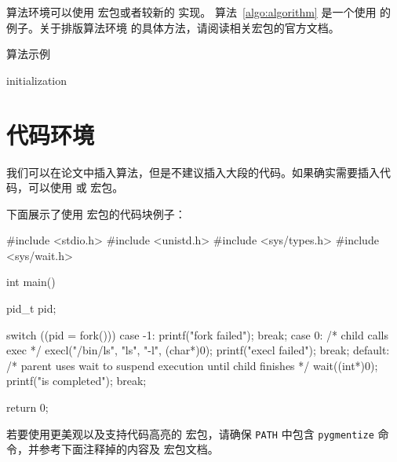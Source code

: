 算法环境可以使用  宏包或者较新的  实现。
算法~\ref{algo:algorithm} 是一个使用  的例子。关于排版算法环境
的具体方法，请阅读相关宏包的官方文档。

\begin{algorithm}[htb]
  \caption{算法示例}
  \label{algo:algorithm}
  \small
  \SetAlgoLined

  initialization\;
\end{algorithm}

\section{代码环境}

我们可以在论文中插入算法，但是不建议插入大段的代码。如果确实需要插入代码，可以使用  或  宏包。

下面展示了使用  宏包的代码块例子：

\begin{codeblock}[language=C]
#include <stdio.h>
#include <unistd.h>
#include <sys/types.h>
#include <sys/wait.h>

int main() {
  pid_t pid;

  switch ((pid = fork())) {
  case -1:
    printf("fork failed\n");
    break;
  case 0:
    /* child calls exec */
    execl("/bin/ls", "ls", "-l", (char*)0);
    printf("execl failed\n");
    break;
  default:
    /* parent uses wait to suspend execution until child finishes */
    wait((int*)0);
    printf("is completed\n");
    break;
  }

  return 0;
}
\end{codeblock}

若要使用更美观以及支持代码高亮的  宏包，请确保 \texttt{PATH} 中包含 \texttt{pygmentize} 命令，并参考下面注释掉的内容及  宏包文档。

